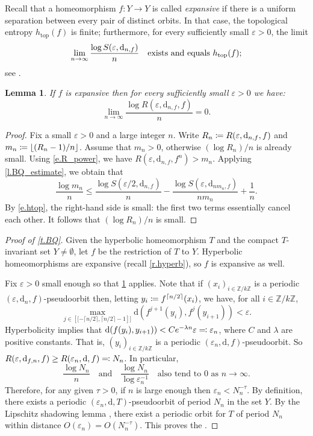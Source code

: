 \documentclass[JEP,XML,SOM,Unicode]{cedram}
\newcommand{\ldbrack}{[\![}
\newcommand{\rdbrack}{]\!]}
\def\vcentcolon{\mathrel{\mathop\ordinarycolon}}
\providecommand\ordinarycolon{:}
\providecommand*\coloneqq{\vcentcolon\mathrel{\mkern-1.2mu}=}
\providecommand*\eqqcolon{=\mathrel{\mkern-1.2mu}\vcentcolon}
\let\eqcolon\eqqcolon
\theoremstyle{plain}
\newtheorem{lemma}[theorem]{Lemma}
\theoremstyle{definition}
\newcommand{\ZZ}{\mathbb{Z}}
\newcommand{\dd}{\mathrm{d}}
\let\epsilon\varepsilon
\begin{document}
Recall that a homeomorphism $f \colon Y \to Y$ is called \emph{expansive} if there is a uniform separation between every pair of distinct orbits. In that case, the topological entropy $h_\mathrm{top}(f)$ is finite; furthermore, for every sufficiently small $\epsilon>0$, the limit
\begin{equation}\label{e.htop}
\lim_{n \to \infty} \frac{\log S(\epsilon,\dd_{n,f})}{n} \quad \text{exists and equals } h_\mathrm{top}(f); \nopagebreak
\end{equation}
see \cite[p.\,174, 177]{Walters}.

\begin{lemma}\label{p.subexp}
If $f$ is expansive then for every sufficiently small $\epsilon>0$ we have:
\[
\lim_{n \to \infty} \frac{\log R(\epsilon,\dd_{n,f},f)}{n} = 0.
\]
\end{lemma}

\begin{proof}
Fix a small $\epsilon>0$ and a large integer $n$.
Write $R_n \coloneqq R(\epsilon,\dd_{n,f},f)$ and $m_n \coloneqq \lfloor (R_n-1)/n \rfloor$.
Assume that $m_n>0$, otherwise $(\log R_n)/n$ is already small.
Using \eqref{e.R_power}, we have $R(\epsilon,\dd_{n,f},f^n) > m_n$.
Applying \cref{l.BQ_estimate}, we obtain that
\[
\frac{\log m_n}{n} \le \frac{\log S(\epsilon/2, \dd_{n,f})}{n} - \frac{\log S(\epsilon, \dd_{nm_n,f})}{nm_n} + \frac{1}{n}.
\]
By \eqref{e.htop}, the right-hand side is small: the first two terms essentially cancel each other.
It follows that $(\log R_n)/n$ is small.
\end{proof}

\begin{proof}[Proof of \cref{t.BQ}]
Given the hyperbolic homeomorphism $T$ and the compact $T$\nobreakdash-invariant set $Y \neq \emptyset$, let
$f$ be the restriction of $T$ to $Y$.
Hyperbolic homeomorphisms are expansive (recall \cref{r.hyperb}), so $f$ is expansive as well.

Fix $\epsilon>0$ small enough so that \cref{p.subexp} applies.
Note that if $(x_i)_{i \in \ZZ/k\ZZ}$ is a periodic $(\epsilon, \dd_n,f)$-pseudoorbit then, letting $y_i \coloneqq f^{\lceil n/2 \rceil}(x_i)$, we have, for all $i \in \ZZ/k\ZZ$,
\[
\max_{j \in \left\ldbrack -\lceil n/2 \rceil, \lceil n/2 \rceil -1 \right\rdbrack}
\dd ( f^{j+1}(y_i), f^j(y_{i+1}) ) < \epsilon.
\]
Hyperbolicity implies that
$\dd ( f(y_i), y_{i+1}) ) < C e^{-\lambda n} \epsilon \eqcolon \epsilon_n$,
where $C$ and $\lambda$ are positive constants.
That is, $(y_i)_{i \in \ZZ/k\ZZ}$ is a periodic $(\epsilon_n, \dd, f)$-pseudoorbit.
So $R(\epsilon, \dd_{f,n}, f) \ge R(\epsilon_n, \dd, f) \eqcolon N_n$.
In particular,
\[
\frac{\log N_n}{n} \quad\text{and}\quad
\frac{\log N_n}{\log \epsilon_n^{-1}}
\quad\text{also tend to $0$ as $n \to \infty$.}
\]
Therefore, for any given $\tau>0$, if $n$ is large enough then $\epsilon_n < N_n^{-\tau}$.
By definition, there exists a periodic $(\epsilon_n, \dd, T)$-pseudoorbit of period $N_n$ in the set $Y$.
By the Lipschitz shadowing lemma \cite[Th.\,2]{Sakai}, there exist a periodic orbit for $T$ of period $N_n$ within distance $O(\epsilon_n) = O(N_n^{-\tau})$.
This proves the .
\end{proof}
\end{document}
